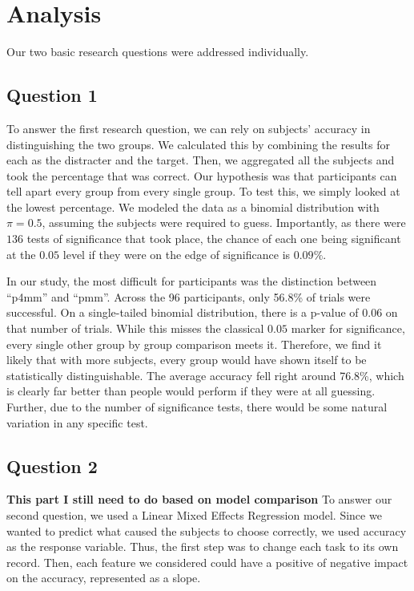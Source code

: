 \section{Analysis}
Our two basic research questions were addressed individually.

\subsection{Question 1}
To answer the first research question, we can rely on subjects' accuracy in distinguishing the two groups. We calculated this by combining the results for each as the distracter and the target. Then, we aggregated all the subjects and took the percentage that was correct. Our hypothesis was that participants can tell apart every group from every single group. To test this, we simply looked at the lowest percentage. We modeled the data as a binomial distribution with $\pi=0.5$, assuming the subjects were required to guess. Importantly, as there were $136$ tests of significance that took place, the chance of each one being significant at the $0.05$ level if they were on the edge of significance is $0.09\%$. 

In our study, the most difficult for participants was the distinction between “p4mm” and “pmm”. Across the 96 participants, only 56.8\% of trials were successful. On a single-tailed binomial distribution, there is a p-value of $0.06$ on that number of trials. While this misses the classical $0.05$ marker for significance, every single other group by group comparison meets it. Therefore, we find it likely that with more subjects, every group would have shown itself to be statistically distinguishable. The average accuracy fell right around 76.8\%, which is clearly far better than people would perform if they were at all guessing. Further, due to the number of significance tests, there would be some natural variation in any specific test.

\subsection{Question 2}
\textbf{This part I still need to do based on model comparison}
To answer our second question, we used a Linear Mixed Effects Regression model. Since we wanted to predict what caused the subjects to choose correctly, we used accuracy as the response variable. Thus, the first step was to change each task to its own record. Then, each feature we considered could have a positive of negative impact on the accuracy, represented as a slope.

